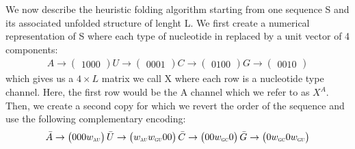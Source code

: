 \documentclass[a4paper,12pt]{article}
\begin{document}
We now describe the heuristic folding algorithm starting from one sequence S and
its associated unfolded structure of lenght L. We first create a numerical
representation of S where each type of nucleotide in replaced by a unit vector
of 4 components:
\begin{equation}
\begin{split}
A \rightarrow \begin{pmatrix} 1 0 0 0 \end{pmatrix}
U \rightarrow \begin{pmatrix} 0 0 0 1 \end{pmatrix}
C \rightarrow \begin{pmatrix} 0 1 0 0 \end{pmatrix}
G \rightarrow \begin{pmatrix} 0 0 1 0 \end{pmatrix}
\end{split}
\end{equation}
which gives us a \(4 \times L\) matrix we call X where each row is a nucleotide
type channel. Here, the first row would be the A channel which we refer to as
\(X^A\). Then, we create a second copy for which we revert the order of the
sequence and use the following complementary encoding:
\begin{equation}
\begin{split}
\bar{A} \rightarrow \begin{pmatrix} 0 0 0 w_{\scalebox{0.5}{AU}} \end{pmatrix}
\bar{U} \rightarrow \begin{pmatrix} w_{\scalebox{0.5}{AU}} w_{\scalebox{0.5}{GU}} 0 0 \end{pmatrix}
\bar{C} \rightarrow \begin{pmatrix} 0 0 w_{\scalebox{0.5}{GC}} 0 \end{pmatrix}
\bar{G} \rightarrow \begin{pmatrix} 0 w_{\scalebox{0.5}{GC}} 0 w_{\scalebox{0.5}{GU}} \end{pmatrix}
\end{split}
\end{equation}
\end{document}
